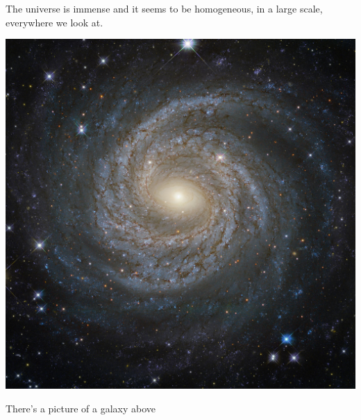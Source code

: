 \documentclass{article}
\begin{document}
The universe is immense and it seems to be homogeneous, 
in a large scale, everywhere we look at.
 
\includegraphics[scale=0.1]{image.jpg}
 
 {\selectfont
There's a picture of a galaxy above
}
\end{document}
